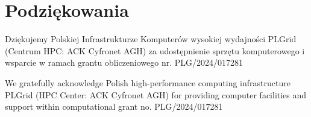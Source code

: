 \documentclass[data-science]{agh-wi} %
\begin{document}
\chapter{Podziękowania}

Dziękujemy Polskiej Infrastrukturze Komputerów wysokiej wydajności PLGrid (Centrum HPC: ACK Cyfronet AGH) za udostępnienie sprzętu komputerowego i wsparcie w ramach grantu obliczeniowego nr. PLG/2024/017281
\vspace*{2cm}

We gratefully acknowledge Polish high-performance computing infrastructure PLGrid (HPC Center: ACK Cyfronet AGH) for providing computer facilities and support within computational grant no. PLG/2024/017281


\printbibliography
\end{document}
